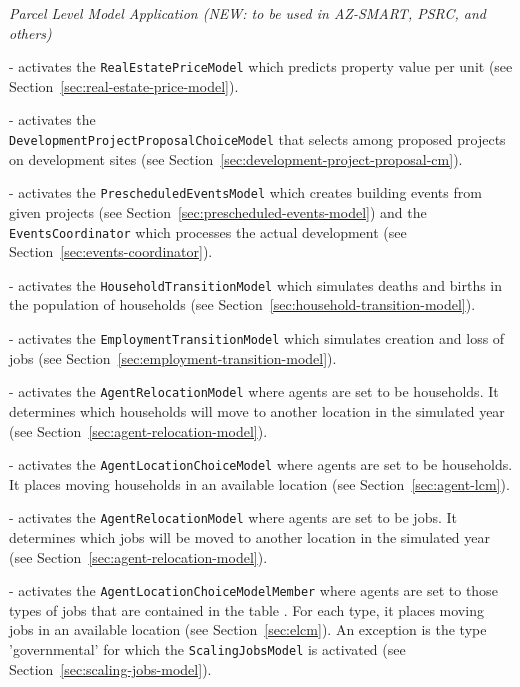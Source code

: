\emph{Parcel Level Model Application (NEW: to be used in AZ-SMART, PSRC, and others)}
\begin{description}
  \tight
  \item[``real_estate_price_model''] \modelsindex - activates the \verb|RealEstatePriceModel| \modelsindex which
  predicts property value per unit (see Section~\ref{sec:real-estate-price-model}).
  \item[``development_project_proposal_choice_model''] \modelsindex - activates
  the \\ \verb|DevelopmentProjectProposalChoiceModel| \modelsindex that selects among
  proposed projects on development sites 
  (see Section~\ref{sec:development-project-proposal-cm}).
  \item[``prescheduled_events''] \modelsindex - activates the
  \verb|PrescheduledEventsModel| \modelsindex which creates building events from
  given projects (see Section~\ref{sec:prescheduled-events-model}) and
  the \verb|EventsCoordinator| which processes the actual development
  (see Section~\ref{sec:events-coordinator}).
  \item[``household_transition_model''] \modelsindex - activates the
  \verb|HouseholdTransitionModel| \modelsindex which simulates deaths and births in the
  population of households (see Section~\ref{sec:household-transition-model}).
  \item[``employment_transition_model''] \modelsindex - activates the
  \verb|EmploymentTransitionModel| \modelsindex which simulates creation and loss of jobs
  (see Section~\ref{sec:employment-transition-model}).
  \item[``household_relocation_model''] \modelsindex - activates the
  \verb|AgentRelocationModel| \modelsindex where agents are set to be households. It
  determines which households will move to another location in the simulated
  year (see Section~\ref{sec:agent-relocation-model}).
  \item[``household_location_choice_model''] \modelsindex - activates the
  \verb|AgentLocationChoiceModel| \modelsindex where agents are set to be households. It
  places moving households in an available location (see
  Section~\ref{sec:agent-lcm}).
  \item[``employment_relocation_model''] \modelsindex - activates the
  \verb|AgentRelocationModel| \modelsindex where agents are set to be jobs. It determines
  which jobs will be moved to another location in the simulated year (see
  Section~\ref{sec:agent-relocation-model}).
  \item[``employment_location_choice_model''] \modelsindex - activates the
  \verb|AgentLocationChoiceModelMember| \modelsindex where agents are set to those types of jobs
  that are contained in the table .
  For each type, it places moving jobs in an available location (see
  Section~\ref{sec:elcm}). An exception is the type 'governmental' for which the \verb|ScalingJobsModel| is activated
  (see Section~\ref{sec:scaling-jobs-model}).
\end{description}

